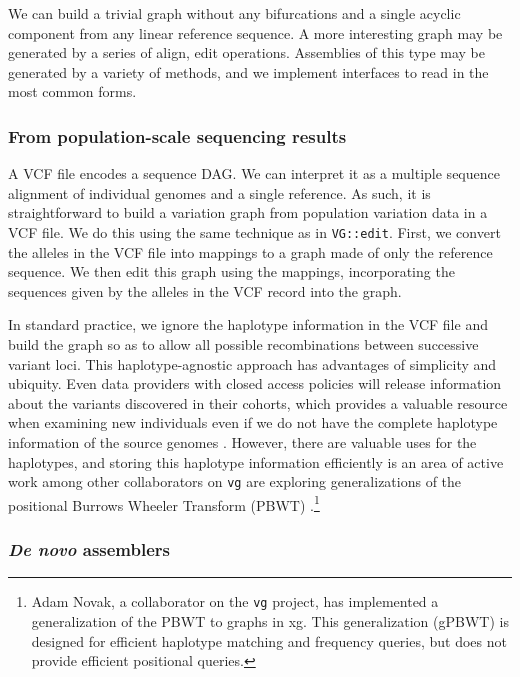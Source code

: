 \documentclass[12pt]{article}
\begin{document}
We can build a trivial graph without any bifurcations and a single acyclic component from any linear reference sequence.
A more interesting graph may be generated by a series of align, edit operations.
Assemblies of this type may be generated by a variety of methods, and we implement interfaces to read in the most common forms.

\subsubsection{From population-scale sequencing results}

A VCF file encodes a sequence DAG.
We can interpret it as a multiple sequence alignment of individual genomes and a single reference.
As such, it is straightforward to build a variation graph from population variation data in a VCF file.
We do this using the same technique as in {\tt VG::edit}.
First, we convert the alleles in the VCF file into mappings to a graph made of only the reference sequence. 
We then edit this graph using the mappings, incorporating the sequences given by the alleles in the VCF record into the graph. 

In standard practice, we ignore the haplotype information in the VCF file and build the graph so as to allow all possible recombinations between successive variant loci.
This haplotype-agnostic approach has advantages of simplicity and ubiquity.
Even data providers with closed access policies will release information about the variants discovered in their cohorts, which provides a valuable resource when examining new individuals even if we do not have the complete haplotype information of the source genomes \cite{exac2015}.
However, there are valuable uses for the haplotypes, and storing this haplotype information efficiently is an area of active work among other collaborators on {\tt vg} are exploring generalizations of the positional Burrows Wheeler Transform (PBWT) \cite{durbin2014}.\footnote{Adam Novak, a collaborator on the {\tt vg} project, has implemented a generalization of the PBWT to graphs in xg. This generalization (gPBWT) is designed for efficient haplotype matching and frequency queries, but does not provide efficient positional queries.}

\subsubsection{\emph{De novo} assemblers}
\end{document}
